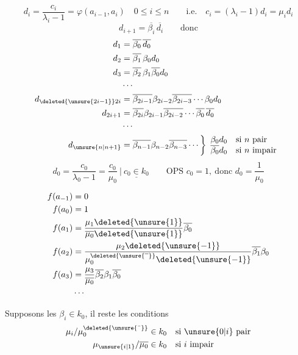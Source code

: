 \[
d_i=\frac{c_i}{\lambda_i-1}=\varphi(a_{i-1},a_i)\quad
0\leq i\leq n\qquad\text{i.e.}\quad c_i=(\lambda_i-1)d_i=\mu_i d_i
\]
\[
d_{i+1}=\overline{\beta_i}\,\overline{d_i}\qquad\text{donc}
\]
\[
\begin{aligned}
d_1&=\overline{\beta_0}\,\overline{d_0}\\
d_2&=\overline{\beta_1}\,\beta_0 d_0\\
d_3&=\overline{\beta_2}\,\beta_1\overline{\beta_0}d_0\\
&\cdots\\
d_{\deleted{\unsure{2i-1}}2i}&=\overline{\beta_{2i-1}}\beta_{2i-2}\overline{\beta_{2i-3}}\cdots\beta_0d_0\\
d_{2i+1}&=\overline{\beta_{2i}}\beta_{2i-1}\overline{\beta_{2i-2}}\cdots\overline{\beta_0}\,\overline{d_0}\\
&\cdots\\
d_{\unsure{n|n+1}}&=\overline{\beta_{n-1}}\beta_{n-2}\overline{\beta_{n-3}}\cdots
\left\}\begin{array}{ll}\beta_0d_0&\text{si }n\text{ pair}\\\overline{\beta_0}d_0&\text{si }n\text{ impair}\end{array}\right.
\end{aligned}
\]
\[
d_0=\frac{c_0}{\lambda_0-1}=\frac{c_0}{\mu_0}\ \Big|\ \underline{c_0\in k_0}
\qquad \text{OPS }c_0=1,\ \text{donc }d_0=\frac{1}{\mu_0}
\]

\[
\begin{aligned}
f(a_{-1})&=0\\
f(a_0)&=1\\
f(a_1)&=\frac{\mu_1\deleted{\unsure{1}}}{\overline{\mu_0}\deleted{\unsure{1}}}\overline{\beta_0}\\
f(a_2)&=\frac{\mu_2\deleted{\unsure{-1}}}{\mu_0^{\deleted{\unsure{\overline{\phantom{a}}}}}\deleted{\unsure{-1}}}\overline{\beta_1}\beta_0\\
f(a_3)&=\frac{\mu_3}{\overline{\mu_0}}\overline{\beta_2}\beta_1\overline{\beta_0}\\
&\cdots
\end{aligned}
\]

Supposons les $\beta_i\in k_0$, il reste les conditions
\[
\begin{aligned}
\mu_i/\mu_0^{\deleted{\unsure{\bar{\phantom{a}}}}}&\in k_0\quad\text{si }\unsure{0|i}\text{ pair}\\
\mu_{\unsure{i|1}}/\overline{\mu_0}&\in k_0\quad\text{si }i\text{ impair}
\end{aligned}
\]

